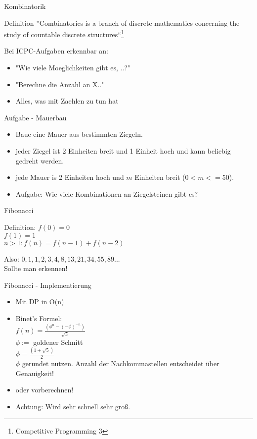 \documentclass[18pt]{beamer}
\begin{document}
\begin{frame}{Kombinatorik}
\begin{block}{Definition}
	''Combinatorics is a branch of discrete mathematics concerning the study of countable discrete structures``\footnote{Competitive Programming 3}
\end{block}
\pause
Bei ICPC-Aufgaben erkennbar an:
\begin{itemize}
	\item "Wie viele Moeglichkeiten gibt es, ..?"
	\item "Berechne die Anzahl an X.."
	\item Alles, was mit Zaehlen zu tun hat
\end{itemize}
\end{frame}


\begin{frame}{Aufgabe - Mauerbau}
\begin{itemize}
	\item Baue eine Mauer aus bestimmten Ziegeln.
	\item jeder Ziegel ist 2 Einheiten breit und 1 Einheit hoch und kann beliebig gedreht werden.
	\item jede Mauer is 2 Einheiten hoch und \(m\) Einheiten breit (\(0<m<=50\)). 
	\item Aufgabe: Wie viele Kombinationen an Ziegelsteinen gibt es?
\end{itemize}
\end{frame}


\begin{frame}{Fibonacci}
\begin{block}{Definition:}
\(f(0)=0\)\\
\(f(1)=1\)\\
\(n>1: f(n)=f(n-1)+f(n-2)\)\\
\end{block}
Also: \(0, 1, 1, 2, 3, 4, 8, 13, 21, 34, 55, 89...\)\\

Sollte man erkennen!
\end{frame}


\begin{frame}{Fibonacci - Implementierung}
\begin{itemize}
\item Mit DP in O(n)
\item Binet's Formel: \\
\(f(n) = \frac{(\phi^{n} - (-\phi)^{-n}) }{ \sqrt{5}}\)\\
\(\phi :=\)  goldener Schnitt\\
\(\phi = \frac{ (1+\sqrt{5})}{2}\)\\
\(\phi\) gerundet nutzen. Anzahl der Nachkommastellen entscheidet über Genauigkeit!

\item oder vorberechnen!\\
\item Achtung: Wird sehr schnell sehr groß.
\end{itemize}
\end{frame}
\end{document}
